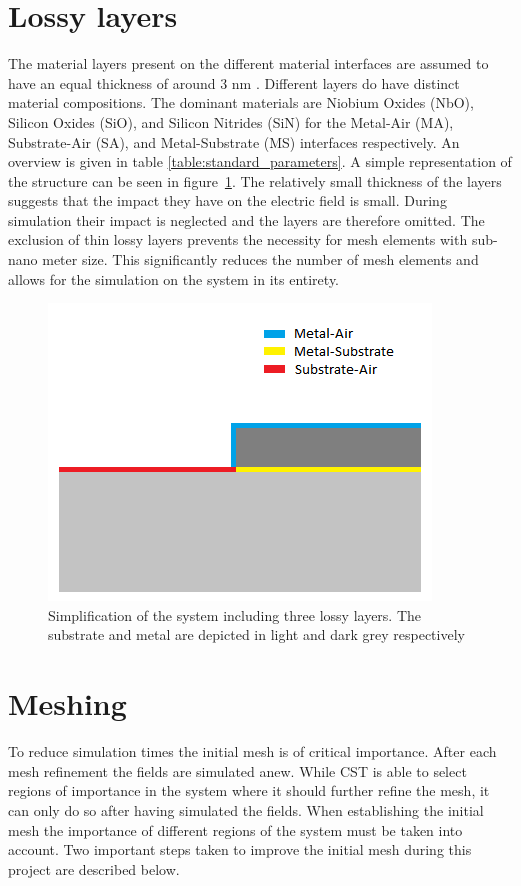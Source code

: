 \section{Lossy layers}
The material layers present on the different material interfaces are assumed to have an equal thickness of around 3 nm \cite{Wenner2011}. Different layers do have distinct material compositions. The dominant materials are Niobium Oxides (NbO), Silicon Oxides (SiO), and Silicon Nitrides (SiN) for the Metal-Air (MA), Substrate-Air (SA), and Metal-Substrate (MS) interfaces respectively. An overview is given in table \ref{table:standard_parameters}.  A simple representation of the structure can be seen in figure~\ref{fig:model}.
The relatively small thickness of the layers suggests that the impact they have on the electric field is small. During simulation their impact is neglected and the layers are therefore omitted. The exclusion of thin lossy layers prevents the necessity for mesh elements with sub-nano meter size. This significantly reduces the number of mesh elements and allows for the simulation on the system in its entirety.
\begin{figure}
	\begin{center}
		\includegraphics[scale=.8]{Figures/model}
		\caption{Simplification of the system including three lossy layers. The substrate and metal are depicted in light and dark grey respectively}
		\label{fig:model}
	\end{center}
\end{figure}

\section{Meshing}
To reduce simulation times the initial mesh is of critical importance. After each mesh refinement the fields are simulated anew. While CST is able to select regions of importance in the system where it should further refine the mesh, it can only do so after having simulated the fields. When establishing the initial mesh the importance of different regions of the system must be taken into account. Two  important steps taken to improve the initial mesh during this project are described below.   


